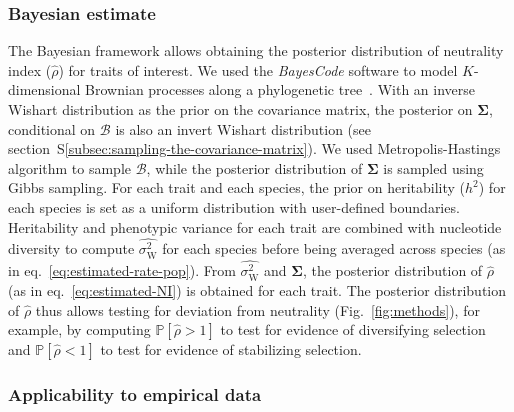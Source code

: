 \documentclass{article}
\newcommand{\UniDimArray}[1]{\bm{#1}}
\newcommand{\BiDimArray}[1]{\bm{#1}}
\newcommand{\proba}{\mathbb{P}}
\newcommand{\Heritability}{h^2}
\newcommand{\RateWhithin}{\sigma^2_{\mathrm{W}}}
\newcommand{\EstRateWhithin}{\widehat{\RateWhithin}}
\newcommand{\EstNI}{\widehat{\rho}}
\newcommand{\Ntrait}{K}
\newcommand{\Covariancematrix}{\Sigma}
\newcommand{\CovarianceMatrix}{\BiDimArray{\Covariancematrix}}
\newcommand{\brownian}{\mathcal{B}}
\newcommand{\Brownian}{\UniDimArray{\brownian}}
\begin{document}
\subsubsection*{Bayesian estimate}
The Bayesian framework allows obtaining the posterior distribution of neutrality index ($\EstNI$) for traits of interest.
We used the \textit{BayesCode} software to model $\Ntrait$-dimensional Brownian processes along a phylogenetic tree~\parencite{latrille_inferring_2021}.
With an inverse Wishart distribution as the {prior} on the covariance matrix, the {posterior} on $\CovarianceMatrix$, conditional on $\brownian$ is also an invert Wishart distribution (see section~S\ref{subsec:sampling-the-covariance-matrix}).
We used Metropolis-Hastings algorithm to sample $\Brownian$, while the posterior distribution of $\CovarianceMatrix$ is sampled using Gibbs sampling.
For each trait and each species, the prior on heritability ($\Heritability$) for each species is set as a uniform distribution with user-defined boundaries.
Heritability and phenotypic variance for each trait are combined with nucleotide diversity to compute $\EstRateWhithin$ for each species before being averaged across species (as in eq.~\ref{eq:estimated-rate-pop}).
From $\EstRateWhithin$ and $\CovarianceMatrix$, the posterior distribution of $\EstNI$ (as in eq.~\ref{eq:estimated-NI}) is obtained for each trait.
The posterior distribution of $\EstNI$ thus allows testing for deviation from neutrality (Fig.~\ref{fig:methods}), for example, by computing $\proba [\EstNI > 1 ]$ to test for evidence of diversifying selection and $\proba [\EstNI < 1 ]$ to test for evidence of stabilizing selection.

\subsubsection*{Applicability to empirical data}
\end{document}

